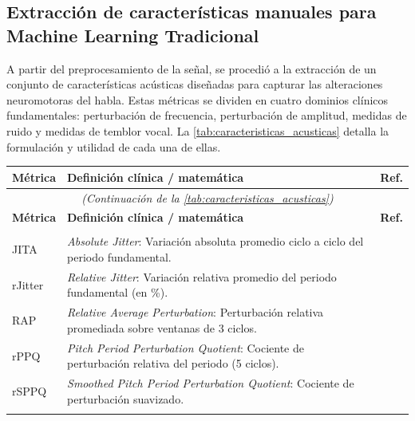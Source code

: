     \subsection{Extracción de características manuales para Machine Learning Tradicional}
            A partir del preprocesamiento de la señal, se procedió a la extracción de un conjunto de características acústicas diseñadas para capturar las alteraciones neuromotoras del habla. Estas métricas se dividen en cuatro dominios clínicos fundamentales: perturbación de frecuencia, perturbación de amplitud, medidas de ruido y medidas de temblor vocal. La \autoref{tab:caracteristicas_acusticas} detalla la formulación y utilidad de cada una de ellas.
            \\

            \small
            \begin{longtable}[c]{@{} l >{\raggedright\arraybackslash}p{7.8cm} l @{}}
                \toprule
                \textbf{Métrica} & \textbf{Definición clínica / matemática} & \textbf{Ref.} \\
                \midrule
                \endfirsthead

                \multicolumn{3}{c}{\small\textit{(Continuación de la \autoref{tab:caracteristicas_acusticas})}} \\[0.3em]
                \toprule
                \textbf{Métrica} & \textbf{Definición clínica / matemática} & \textbf{Ref.} \\
                \midrule
                \endhead

                \bottomrule
                \endlastfoot

                \multicolumn{3}{@{}l}{\textbf{Medidas de Perturbación de Frecuencia (\textit{Jitter})}} \\
                \midrule
                JITA   & \textit{Absolute Jitter}: Variación absoluta promedio ciclo a ciclo del periodo fundamental. & \cite{praat2018} \\
                rJitter & \textit{Relative Jitter}: Variación relativa promedio del periodo fundamental (en \%). & \cite{praat2018} \\
                RAP    & \textit{Relative Average Perturbation}: Perturbación relativa promediada sobre ventanas de 3 ciclos. & \cite{praat2018} \\
                rPPQ   & \textit{Pitch Period Perturbation Quotient}: Cociente de perturbación relativa del periodo (5 ciclos). & \cite{praat2018} \\
                rSPPQ  & \textit{Smoothed Pitch Period Perturbation Quotient}: Cociente de perturbación suavizado. & \cite{farrus2007} \\
                \addlinespace


\end{longtable}
